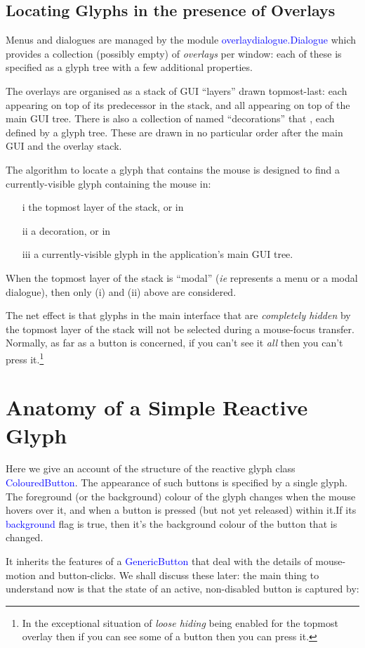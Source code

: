 \documentclass[12pt,a4paper]{article}
\def\Scala#1{\textcolor{blue}{\textsf{#1}}}
\def\S#1{\section{#1}}
\def\SS#1{\subsection{#1}}
\begin{document}
\SS{Locating  Glyphs in the presence of Overlays}
Menus and dialogues are managed by the module
\Scala{overlaydialogue.Dialogue} which provides a collection
(possibly empty) of \textit{overlays} per window: each of these is specified as a
glyph tree with a few additional properties.

The overlays  are organised as a stack of GUI ``layers''
drawn topmost-last: each appearing  on top of its predecessor in
the stack, and all appearing on top of the main GUI tree.
There is also a collection of named ``decorations'' that , each defined
by a glyph tree. These are drawn in no particular order after the
main GUI and the overlay stack. 

The algorithm to locate a glyph that contains the mouse is designed to find
a currently-visible glyph containing the mouse in:

\begin{enumerate}
\item[i] the topmost layer of the stack, or in
\item[ii] a decoration, or in
\item[iii] a currently-visible glyph in the application's main GUI tree.
\end{enumerate}

When the topmost layer of the stack is ``modal'' (\textit{ie} represents a menu
or a modal dialogue), then only (i) and (ii) above are considered.

The net effect is that glyphs in the main interface
that are \textit{completely hidden} by the topmost layer of the stack will not
be selected during a mouse-focus transfer. Normally, as far as a button
is concerned, if you can't see it \textit{all} then you can't press
it.\footnote{In the exceptional situation of \textit{loose hiding} being
enabled for the topmost overlay then if you can see some of a button then you can press it.}

\clearpage
\S{Anatomy of a Simple Reactive Glyph}

Here we give an account of the structure of the reactive glyph class
\Scala{ColouredButton}. The appearance of such buttons is specified
by a single glyph. The  foreground (or the background) colour of the glyph
changes when the mouse hovers over it, and when a button is
pressed (but not yet released) within it.If its \Scala{background}
flag is true, then it's the background colour of the button that is changed.

It inherits the features of a \Scala{GenericButton} that deal with
the details of mouse-motion and button-clicks. We shall discuss
these later: the main thing to understand now is that the state of
an active, non-disabled button is captured by:
\end{document}
